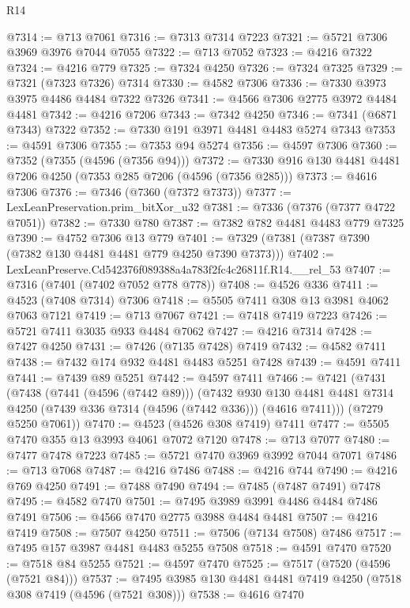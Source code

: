 \begin{lexlean}{R14}
\begin{coremodule}
@7314 := @713 @7061
@7316 := @7313 @7314 @7223
@7321 := @5721 @7306 @3969 @3976 @7044 @7055
@7322 := @713 @7052
@7323 := @4216 @7322
@7324 := @4216 @779
@7325 := @7324 @4250
@7326 := @7324 @7325
@7329 := @7321 (@7323 @7326) @7314
@7330 := @4582 @7306
@7336 := @7330 @3973 @3975 @4486 @4484 @7322 @7326
@7341 := @4566 @7306 @2775 @3972 @4484 @4481
@7342 := @4216 @7206
@7343 := @7342 @4250
@7346 := @7341 (@6871 @7343) @7322
@7352 := @7330 @191 @3971 @4481 @4483 @5274 @7343
@7353 := @4591 @7306
@7355 := @7353 @94 @5274
@7356 := @4597 @7306
@7360 := @7352 (@7355 (@4596 (@7356 @94)))
@7372 := @7330 @916 @130 @4481 @4481 @7206 @4250 (@7353 @285 @7206 (@4596 (@7356 @285)))
@7373 := @4616 @7306
@7376 := @7346 (@7360 (@7372 @7373))
@7377 := LexLeanPreservation.prim_bitXor_u32
@7381 := @7336 (@7376 (@7377 @4722 @7051))
@7382 := @7330 @780
@7387 := @7382 @782 @4481 @4483 @779 @7325
@7390 := @4752 @7306 @13 @779
@7401 := @7329 (@7381 (@7387 @7390 (@7382 @130 @4481 @4481 @779 @4250 @7390 @7373)))
@7402 := LexLeanPreserve.Cd542376f089388a4a783f2fc4c26811f.R14.__rel_53
@7407 := @7316 (@7401 (@7402 @7052 @778 @778))
@7408 := @4526 @336
@7411 := @4523 (@7408 @7314) @7306
@7418 := @5505 @7411 @308 @13 @3981 @4062 @7063 @7121
@7419 := @713 @7067
@7421 := @7418 @7419 @7223
@7426 := @5721 @7411 @3035 @933 @4484 @7062
@7427 := @4216 @7314
@7428 := @7427 @4250
@7431 := @7426 (@7135 @7428) @7419
@7432 := @4582 @7411
@7438 := @7432 @174 @932 @4481 @4483 @5251 @7428
@7439 := @4591 @7411
@7441 := @7439 @89 @5251
@7442 := @4597 @7411
@7466 := @7421
    (@7431
      (@7438
        (@7441 (@4596 (@7442 @89)))
        (@7432
          @930
          @130
          @4481
          @4481
          @7314
          @4250
          (@7439 @336 @7314 (@4596 (@7442 @336)))
          (@4616 @7411)))
      (@7279 @5250 @7061))
@7470 := @4523 (@4526 @308 @7419) @7411
@7477 := @5505 @7470 @355 @13 @3993 @4061 @7072 @7120
@7478 := @713 @7077
@7480 := @7477 @7478 @7223
@7485 := @5721 @7470 @3969 @3992 @7044 @7071
@7486 := @713 @7068
@7487 := @4216 @7486
@7488 := @4216 @744
@7490 := @4216 @769 @4250
@7491 := @7488 @7490
@7494 := @7485 (@7487 @7491) @7478
@7495 := @4582 @7470
@7501 := @7495 @3989 @3991 @4486 @4484 @7486 @7491
@7506 := @4566 @7470 @2775 @3988 @4484 @4481
@7507 := @4216 @7419
@7508 := @7507 @4250
@7511 := @7506 (@7134 @7508) @7486
@7517 := @7495 @157 @3987 @4481 @4483 @5255 @7508
@7518 := @4591 @7470
@7520 := @7518 @84 @5255
@7521 := @4597 @7470
@7525 := @7517 (@7520 (@4596 (@7521 @84)))
@7537 := @7495 @3985 @130 @4481 @4481 @7419 @4250 (@7518 @308 @7419 (@4596 (@7521 @308)))
@7538 := @4616 @7470

\end{coremodule}
\end{lexlean}
